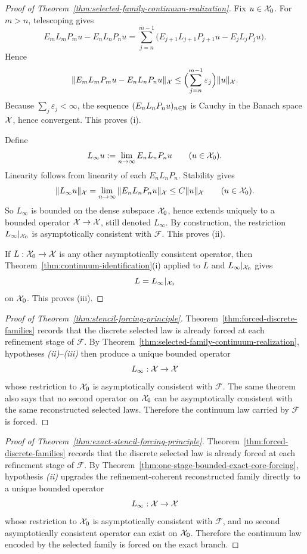 \begin{proof}[Proof of Theorem~\ref{thm:selected-family-continuum-realization}]
\label{proof:thm:selected-family-continuum-realization}
Fix $u\in\mathcal{X}_0$. For $m>n$, telescoping gives
\[
E_mL_mP_mu-E_nL_nP_nu
=
\sum_{j=n}^{m-1}
\bigl(E_{j+1}L_{j+1}P_{j+1}u-E_jL_jP_ju\bigr).
\]
Hence
\[
\|E_mL_mP_mu-E_nL_nP_nu\|_{\mathcal{X}}
\le
\Bigl(\sum_{j=n}^{m-1}\varepsilon_j\Bigr)\|u\|_{\mathcal{X}}.
\]
Because \(\sum_j\varepsilon_j<\infty\), the sequence
\((E_nL_nP_nu)_{n\in\mathbb{N}}\) is Cauchy in the Banach space \(\mathcal{X}\), hence
convergent. This proves (i).

Define
\[
L_\infty u:=\lim_{n\to\infty}E_nL_nP_nu
\qquad (u\in\mathcal{X}_0).
\]
Linearity follows from linearity of each \(E_nL_nP_n\). Stability gives
\[
\|L_\infty u\|_{\mathcal{X}}
=
\lim_{n\to\infty}\|E_nL_nP_nu\|_{\mathcal{X}}
\le
C\|u\|_{\mathcal{X}}
\qquad (u\in\mathcal{X}_0).
\]
So \(L_\infty\) is bounded on the dense subspace \(\mathcal{X}_0\), hence extends
uniquely to a bounded operator \(\mathcal{X}\to\mathcal{X}\), still denoted \(L_\infty\). By
construction, the restriction \(L_\infty|_{\mathcal{X}_0}\) is asymptotically
consistent with \(\mathcal F\). This proves (ii).

If \(L:\mathcal{X}_0\to\mathcal{X}\) is any other asymptotically consistent operator, then
Theorem~\ref{thm:continuum-identification}(i) applied to
\(L\) and \(L_\infty|_{\mathcal{X}_0}\) gives
\[
L=L_\infty|_{\mathcal{X}_0}
\]
on \(\mathcal{X}_0\). This proves (iii).
\end{proof}

\begin{proof}[Proof of Theorem~\ref{thm:stencil-forcing-principle}]
\label{proof:thm:stencil-forcing-principle}
Theorem~\ref{thm:forced-discrete-families} records that the discrete selected
law is already forced at each refinement stage of \(\mathcal F\). By
Theorem~\ref{thm:selected-family-continuum-realization}, hypotheses
\emph{(ii)}--\emph{(iii)} then produce a unique bounded operator
\[
L_\infty:\mathcal{X}\to\mathcal{X}
\]
whose restriction to \(\mathcal{X}_0\) is asymptotically consistent with
\(\mathcal F\). The same theorem also says that no second operator on
\(\mathcal{X}_0\) can be asymptotically consistent with the same reconstructed
selected laws. Therefore the continuum law carried by \(\mathcal F\) is
forced.
\end{proof}

\begin{proof}[Proof of Theorem~\ref{thm:exact-stencil-forcing-principle}]
\label{proof:thm:exact-stencil-forcing-principle}
Theorem~\ref{thm:forced-discrete-families} records that the discrete selected
law is already forced at each refinement stage of \(\mathcal F\). By
Theorem~\ref{thm:one-stage-bounded-exact-core-forcing}, hypothesis
\emph{(ii)} upgrades the refinement-coherent reconstructed family directly to a
unique bounded operator
\[
L_\infty:\mathcal{X}\to\mathcal{X}
\]
whose restriction to \(\mathcal{X}_0\) is asymptotically consistent with
\(\mathcal F\), and no second asymptotically consistent operator can exist on
\(\mathcal{X}_0\). Therefore the continuum law encoded by the selected family is
forced on the exact branch.
\end{proof}

